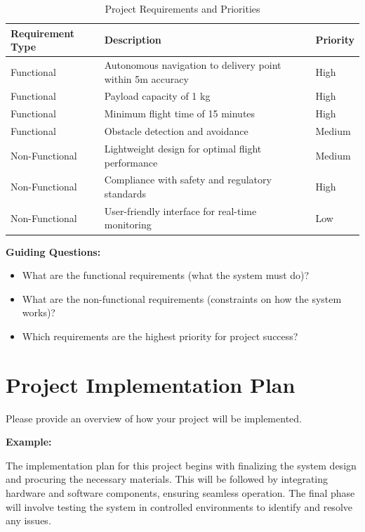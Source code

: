 \begin{table}[h!]
    \centering
    \begin{tabular}{|l|l|l|}
        \hline
        \textbf{Requirement Type} & \textbf{Description} & \textbf{Priority} \\ \hline
        Functional & Autonomous navigation to delivery point within 5m accuracy & High \\ \hline
        Functional & Payload capacity of 1 kg & High \\ \hline
        Functional & Minimum flight time of 15 minutes & High \\ \hline
        Functional & Obstacle detection and avoidance & Medium \\ \hline
        Non-Functional & Lightweight design for optimal flight performance & Medium \\ \hline
        Non-Functional & Compliance with safety and regulatory standards & High \\ \hline
        Non-Functional & User-friendly interface for real-time monitoring & Low \\ \hline
    \end{tabular}
    \caption{Project Requirements and Priorities}
    \label{tab:req}
\end{table}

\textbf{Guiding Questions:}
\begin{itemize}
    \item What are the functional requirements (what the system must do)?
    \item What are the non-functional requirements (constraints on how the system works)?
    \item Which requirements are the highest priority for project success?
\end{itemize}

\newpage
\section{Project Implementation Plan}
Please provide an overview of how your project will be implemented.

\textbf{Example:}

The implementation plan for this project begins with finalizing the system design and procuring the necessary materials. This will be followed by integrating hardware and software components, ensuring seamless operation. The final phase will involve testing the system in controlled environments to identify and resolve any issues.

